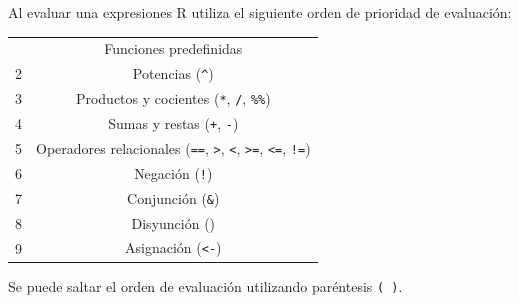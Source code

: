 \documentclass[
  spanish,
  a4paper,
]{scrreport}
\newcounter{none} %
\theoremstyle{definition}
\theoremstyle{definition}
\theoremstyle{remark}
\begin{document}
Al evaluar una expresiones R utiliza el siguiente orden de prioridad de
evaluación:

{\def\LTcaptype{none} %
\begin{longtable}[]{@{}cc@{}}
\toprule\noalign{}
\endhead
\bottomrule\noalign{}
\endlastfoot
1 & Funciones predefinidas \\
2 & Potencias (\texttt{\^{}}) \\
3 & Productos y cocientes (\texttt{*}, \texttt{/}, \texttt{\%\%}) \\
4 & Sumas y restas (\texttt{+}, \texttt{-}) \\
5 & Operadores relacionales (\texttt{==}, \texttt{\textgreater{}},
\texttt{\textless{}}, \texttt{\textgreater{}=}, \texttt{\textless{}=},
\texttt{!=}) \\
6 & Negación (\texttt{!}) \\
7 & Conjunción (\texttt{\&}) \\
8 & Disyunción (\texttt{\textbar{}}) \\
9 & Asignación (\texttt{\textless{}-}) \\
\end{longtable}
}

Se puede saltar el orden de evaluación utilizando paréntesis
\texttt{(\ )}.
\end{document}
